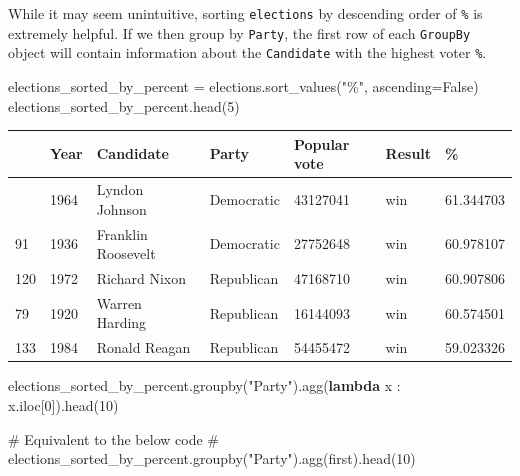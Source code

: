 \documentclass[
  letterpaper,
  DIV=11,
  numbers=noendperiod]{scrreprt}
\newenvironment{Shaded}{\begin{snugshade}}{\end{snugshade}}
\newcommand{\CommentTok}[1]{\textcolor[rgb]{0.37,0.37,0.37}{#1}}
\newcommand{\DecValTok}[1]{\textcolor[rgb]{0.68,0.00,0.00}{#1}}
\newcommand{\KeywordTok}[1]{\textcolor[rgb]{0.00,0.23,0.31}{\textbf{#1}}}
\newcommand{\NormalTok}[1]{\textcolor[rgb]{0.00,0.23,0.31}{#1}}
\newcommand{\OperatorTok}[1]{\textcolor[rgb]{0.37,0.37,0.37}{#1}}
\newcommand{\StringTok}[1]{\textcolor[rgb]{0.13,0.47,0.30}{#1}}
\newcommand{\VariableTok}[1]{\textcolor[rgb]{0.07,0.07,0.07}{#1}}
\begin{document}
While it may seem unintuitive, sorting \texttt{elections} by descending
order of \texttt{\%} is extremely helpful. If we then group by
\texttt{Party}, the first row of each \texttt{GroupBy} object will
contain information about the \texttt{Candidate} with the highest voter
\texttt{\%}.

\begin{Shaded}
\begin{Highlighting}[]
\NormalTok{elections\_sorted\_by\_percent }\OperatorTok{=}\NormalTok{ elections.sort\_values(}\StringTok{"\%"}\NormalTok{, ascending}\OperatorTok{=}\VariableTok{False}\NormalTok{)}
\NormalTok{elections\_sorted\_by\_percent.head(}\DecValTok{5}\NormalTok{)}
\end{Highlighting}
\end{Shaded}

\begin{longtable}[]{@{}lllllll@{}}
\toprule\noalign{}
& Year & Candidate & Party & Popular vote & Result & \% \\
\midrule\noalign{}
\endhead
\bottomrule\noalign{}
\endlastfoot
114 & 1964 & Lyndon Johnson & Democratic & 43127041 & win & 61.344703 \\
91 & 1936 & Franklin Roosevelt & Democratic & 27752648 & win &
60.978107 \\
120 & 1972 & Richard Nixon & Republican & 47168710 & win & 60.907806 \\
79 & 1920 & Warren Harding & Republican & 16144093 & win & 60.574501 \\
133 & 1984 & Ronald Reagan & Republican & 54455472 & win & 59.023326 \\
\end{longtable}

\begin{Shaded}
\begin{Highlighting}[]
\NormalTok{elections\_sorted\_by\_percent.groupby(}\StringTok{"Party"}\NormalTok{).agg(}\KeywordTok{lambda}\NormalTok{ x : x.iloc[}\DecValTok{0}\NormalTok{]).head(}\DecValTok{10}\NormalTok{)}

\CommentTok{\# Equivalent to the below code}
\CommentTok{\# elections\_sorted\_by\_percent.groupby("Party").agg(\textquotesingle{}first\textquotesingle{}).head(10)}
\end{Highlighting}
\end{Shaded}
\end{document}
